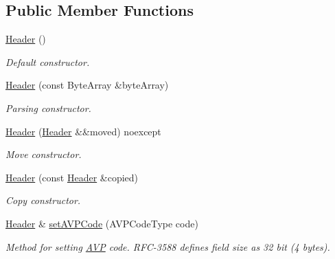 \subsection*{Public Member Functions}
\begin{DoxyCompactItemize}
\item 
\mbox{\label{classDiameter_1_1AVP_1_1Header_a2b5517008e00ca03e5ed873e3c69eeb0}} 
\hyperlink{classDiameter_1_1AVP_1_1Header_a2b5517008e00ca03e5ed873e3c69eeb0}{Header} ()
\begin{DoxyCompactList}\small\item\em Default constructor. \end{DoxyCompactList}\item 
\hyperlink{classDiameter_1_1AVP_1_1Header_ac08a910e8453759d348294223bc35e2f}{Header} (const Byte\+Array \&byte\+Array)
\begin{DoxyCompactList}\small\item\em Parsing constructor. \end{DoxyCompactList}\item 
\mbox{\label{classDiameter_1_1AVP_1_1Header_a283aed1b1f1d8f76cdef476ef73e81e9}} 
\hyperlink{classDiameter_1_1AVP_1_1Header_a283aed1b1f1d8f76cdef476ef73e81e9}{Header} (\hyperlink{classDiameter_1_1AVP_1_1Header}{Header} \&\&moved) noexcept
\begin{DoxyCompactList}\small\item\em Move constructor. \end{DoxyCompactList}\item 
\hyperlink{classDiameter_1_1AVP_1_1Header_abf6df7b319d97fd308ff42eef0cf3996}{Header} (const \hyperlink{classDiameter_1_1AVP_1_1Header}{Header} \&copied)
\begin{DoxyCompactList}\small\item\em Copy constructor. \end{DoxyCompactList}\item 
\hyperlink{classDiameter_1_1AVP_1_1Header}{Header} \& \hyperlink{classDiameter_1_1AVP_1_1Header_a74ba1debad513ac3eaebf760228ee9c0}{set\+A\+V\+P\+Code} (A\+V\+P\+Code\+Type code)
\begin{DoxyCompactList}\small\item\em Method for setting \hyperlink{classDiameter_1_1AVP}{A\+VP} code. R\+F\+C-\/3588 defines field size as 32 bit (4 bytes). \end{DoxyCompactList}\item 

\end{DoxyCompactItemize}
